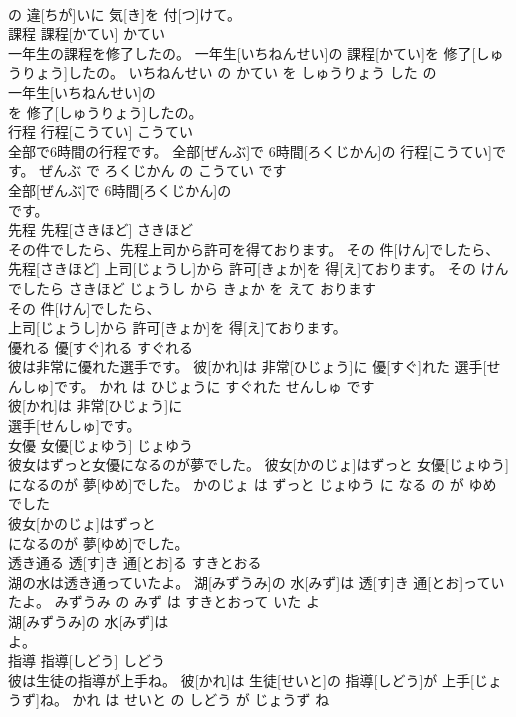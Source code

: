 \documentclass[8pt]{extreport}
\begin{document}
\begin{CJK}{UTF8}{min}
\\	の 違[ちが]いに 気[き]を 付[つ]けて。			
\\	課程	課程[かてい]	かてい	
\\	一年生の課程を修了したの。	一年生[いちねんせい]の 課程[かてい]を 修了[しゅうりょう]したの。	いちねんせい の かてい を しゅうりょう した の	
\\	一年生[いちねんせい]の
\\	を 修了[しゅうりょう]したの。			
\\	行程	行程[こうてい]	こうてい	
\\	全部で6時間の行程です。	全部[ぜんぶ]で 6時間[ろくじかん]の 行程[こうてい]です。	ぜんぶ で ろくじかん の こうてい です	
\\	全部[ぜんぶ]で 6時間[ろくじかん]の
\\	です。			
\\	先程	先程[さきほど]	さきほど	
\\	その件でしたら、先程上司から許可を得ております。	その 件[けん]でしたら、 先程[さきほど] 上司[じょうし]から 許可[きょか]を 得[え]ております。	その けん でしたら さきほど じょうし から きょか を えて おります	
\\	その 件[けん]でしたら、
\\	上司[じょうし]から 許可[きょか]を 得[え]ております。			
\\	優れる	優[すぐ]れる	すぐれる	
\\	彼は非常に優れた選手です。	彼[かれ]は 非常[ひじょう]に 優[すぐ]れた 選手[せんしゅ]です。	かれ は ひじょうに すぐれた せんしゅ です	
\\	彼[かれ]は 非常[ひじょう]に
\\	選手[せんしゅ]です。			
\\	女優	女優[じょゆう]	じょゆう	
\\	彼女はずっと女優になるのが夢でした。	彼女[かのじょ]はずっと 女優[じょゆう]になるのが 夢[ゆめ]でした。	かのじょ は ずっと じょゆう に なる の が ゆめ でした	
\\	彼女[かのじょ]はずっと
\\	になるのが 夢[ゆめ]でした。			
\\	透き通る	透[す]き 通[とお]る	すきとおる	
\\	湖の水は透き通っていたよ。	湖[みずうみ]の 水[みず]は 透[す]き 通[とお]っていたよ。	みずうみ の みず は すきとおって いた よ	
\\	湖[みずうみ]の 水[みず]は
\\	よ。			
\\	指導	指導[しどう]	しどう	
\\	彼は生徒の指導が上手ね。	彼[かれ]は 生徒[せいと]の 指導[しどう]が 上手[じょうず]ね。	かれ は せいと の しどう が じょうず ね	

\end{CJK}
\end{document}
